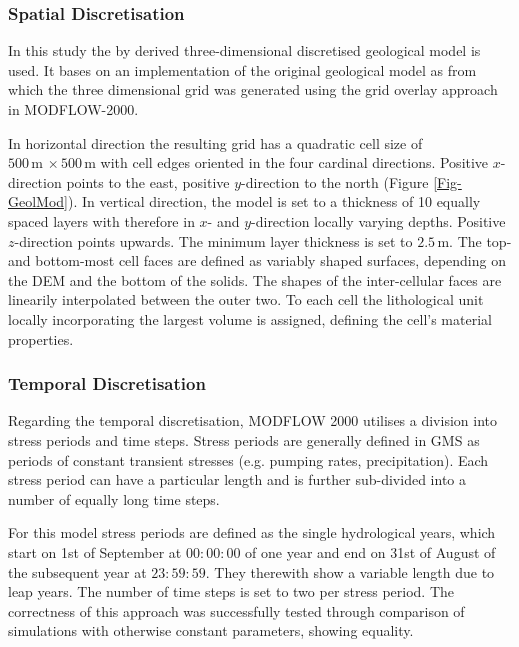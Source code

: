 \subsubsection{Spatial Discretisation}

In this study the by \cite{Horn.2021} derived three-dimensional discretised geological model is used. 
It bases on an implementation of the original geological model as from which the three dimensional grid was generated using the grid overlay approach in MODFLOW-2000.

In horizontal direction the resulting grid has a quadratic cell size of $500 \, \textrm{m} \, \times 500 \, \textrm{m}$ with cell edges oriented in the four cardinal directions. 
Positive $x$-direction points to the east, positive $y$-direction to the north (Figure \ref{Fig-GeolMod}). 
In vertical direction, the model is set to a thickness of 10 equally spaced layers with therefore in $x$- and $y$-direction locally varying depths. 
Positive $z$-direction points upwards. 
The minimum layer thickness is set to $2.5 \, \textrm{m}$. 
The top- and bottom-most cell faces are defined as variably shaped surfaces, depending on the DEM and the bottom of the solids. 
The shapes of the inter-cellular faces are linearily interpolated between the outer two. 
To each cell the lithological unit locally incorporating the largest volume is assigned, defining the cell's material properties.

\subsubsection{Temporal Discretisation}

Regarding the temporal discretisation, MODFLOW 2000 utilises a division into stress periods and time steps. 
Stress periods are generally defined in GMS as periods of constant transient stresses (e.g. pumping rates, precipitation). 
Each stress period can have a particular length and is further sub-divided into a number of equally long time steps.

For this model stress periods are defined as the single hydrological years, which start on 1st of September at ${00\!:\!00\!:\!00}$ of one year and end on 31st of August of the subsequent year at ${23\!:\!59\!:\!59}$. 
They therewith show a variable length due to leap years. 
The number of time steps is set to two per stress period. 
The correctness of this approach was successfully tested through comparison of simulations with otherwise constant parameters, showing equality.

